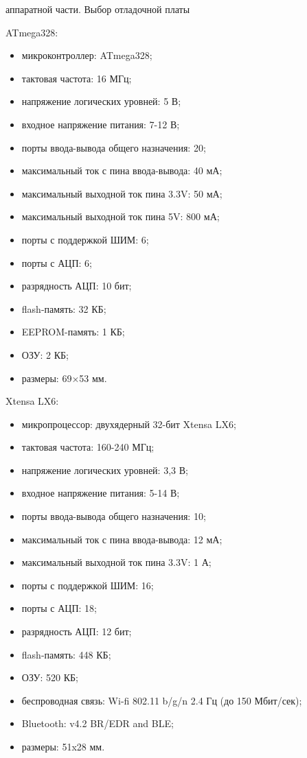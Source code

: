 \documentclass[12pt,a4paper,mathserif]{beamer}
\begin{document}
\begin{frame}{ аппаратной части. Выбор отладочной платы}
    \tiny
    \begin{minipage}{0.5\linewidth}
    ATmega328:
    \begin{itemize}
        \item микроконтроллер: ATmega328;
        \item тактовая частота: 16 МГц;
        \item напряжение логических уровней: 5 В;
        \item входное напряжение питания: 7-12 В;
        \item порты ввода-вывода общего назначения: 20;
        \item максимальный ток с пина ввода-вывода: 40 мА;
        \item максимальный выходной ток пина 3.3V: 50 мА;
        \item максимальный выходной ток пина 5V: 800 мА;
        \item порты с поддержкой ШИМ: 6;
        \item порты с АЦП: 6;
        \item разрядность АЦП: 10 бит;
        \item flash-память: 32 КБ;
        \item EEPROM-память: 1 КБ;
        \item ОЗУ: 2 КБ;
        \item размеры: 69×53 мм.
    \end{itemize}
    \end{minipage}
    \hfill
    \begin{minipage}{0.5\linewidth}
    Xtensa LX6:
    \begin{itemize}
        \item микропроцессор: двухядерный 32-бит Xtensa LX6;
        \item тактовая частота: 160-240 МГц;
        \item напряжение логических уровней: 3,3 В;
        \item входное напряжение питания: 5-14 В;
        \item порты ввода-вывода общего назначения: 10;
        \item максимальный ток с пина ввода-вывода: 12 мА;
        \item максимальный выходной ток пина 3.3V: 1 А;
        \item порты с поддержкой ШИМ: 16;
        \item порты с АЦП: 18;
        \item разрядность АЦП: 12 бит;
        \item flash-память: 448 КБ;
        \item ОЗУ: 520 КБ;
        \item беспроводная связь: Wi-fi 802.11 b/g/n 2.4 Гц (до 150 Мбит/сек);
        \item Bluetooth: v4.2 BR/EDR and BLE;
        \item размеры: 51x28 мм.
    \end{itemize}
    \end{minipage}
\end{frame}
\end{document}
